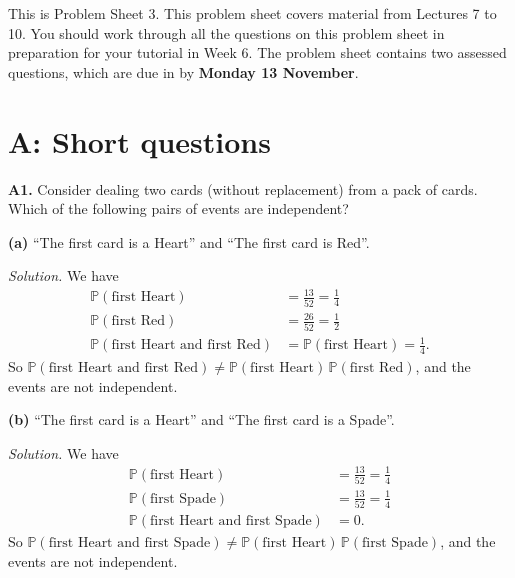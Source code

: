 \documentclass[
  a4paper,
]{book}
\newif\ifcomm\commtrue
\theoremstyle{definition}
\theoremstyle{definition}
\theoremstyle{definition}
\theoremstyle{definition}
\theoremstyle{remark}
\begin{document}
\commfalse

This is Problem Sheet 3. This problem sheet covers material from Lectures 7 to 10. You should work through all the questions on this problem sheet in preparation for your tutorial in Week 6. The problem sheet contains two assessed questions, which are due in by \textbf{Monday 13 November}.

\hypertarget{P3-short}{%
\section*{A: Short questions}\label{P3-short}}

\textbf{A1.} Consider dealing two cards (without replacement) from a pack of cards. Which of the following pairs of events are independent?

\textbf{(a)} ``The first card is a Heart'' and ``The first card is Red''.

\begin{myanswers}
\emph{Solution.}
We have
\begin{align*}
\mathbb P(\text{first Heart}) &= \frac{13}{52} = \frac14 \\
\mathbb P(\text{first Red}) &= \frac{26}{52} = \frac12 \\
\mathbb P(\text{first Heart and first Red}) &= \mathbb P(\text{first Heart}) = \frac14 .
\end{align*}
So \(\mathbb P(\text{first Heart and first Red}) \neq \mathbb P(\text{first Heart})\,\mathbb P(\text{first Red})\), and the events are not independent.

\end{myanswers}

\textbf{(b)} ``The first card is a Heart'' and ``The first card is a Spade''.

\begin{myanswers}
\emph{Solution.}
We have
\begin{align*}
\mathbb P(\text{first Heart}) &= \frac{13}{52} = \frac14 \\
\mathbb P(\text{first Spade}) &= \frac{13}{52} = \frac14 \\
\mathbb P(\text{first Heart and first Spade}) &= 0 .
\end{align*}
So \(\mathbb P(\text{first Heart and first Spade}) \neq \mathbb P(\text{first Heart})\,\mathbb P(\text{first Spade})\), and the events are not independent.

\end{myanswers}
\end{document}
